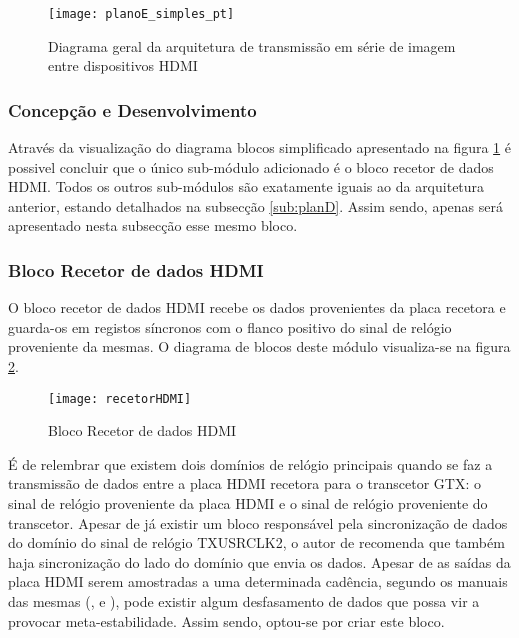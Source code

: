 \begin{figure}[h!]
	\begin{center}
		\leavevmode
		\texttt{[image: planoE\_simples\_pt]}
		\captionsetup{width=1.0\linewidth}
		\caption[Diagrama geral da arquitetura de transmissão em série de imagem entre dispositivos HDMI]{Diagrama geral da arquitetura de transmissão em série de imagem entre dispositivos HDMI}
		\label{fig:planE_simples}
	\end{center}
\end{figure}


\subsubsection{Concepção e Desenvolvimento}

Através da visualização do diagrama blocos simplificado apresentado na figura \ref{fig:planE_simples} é possivel concluir que o único sub-módulo adicionado é o bloco recetor de dados HDMI. Todos os outros sub-módulos são exatamente iguais ao da arquitetura anterior, estando detalhados na subsecção \ref{sub:planD}. Assim sendo, apenas será apresentado nesta subsecção esse mesmo bloco.

\subsubsection*{Bloco Recetor de dados HDMI}
O bloco recetor de dados HDMI recebe os dados provenientes da placa recetora e guarda-os em registos síncronos com o flanco positivo do sinal de relógio proveniente da mesmas. O diagrama de blocos deste módulo visualiza-se na figura \ref{fig:recetorHDMI}.
\begin{figure}[h!]
	\begin{center}
		\leavevmode
		\texttt{[image: recetorHDMI]}
		\captionsetup{width=1.0\linewidth}
		\caption[Bloco recetor de dados HDMI]{Bloco Recetor de dados HDMI}
		\label{fig:recetorHDMI}
	\end{center}
\end{figure}

É de relembrar que existem dois domínios de relógio principais quando se faz a transmissão de dados entre a placa HDMI recetora para o transcetor GTX: o sinal de relógio proveniente da placa HDMI e o sinal de relógio proveniente do transcetor. Apesar de já existir um bloco responsável pela sincronização de dados do domínio do sinal de relógio TXUSRCLK2, o autor de \cite{R024} recomenda que também haja sincronização do lado do domínio que envia os dados. Apesar de as saídas da placa HDMI serem amostradas a uma determinada cadência, segundo os manuais das mesmas (\cite{R009}, \cite{R014} e \cite{R013}), pode existir algum desfasamento de dados que possa vir a provocar meta-estabilidade. Assim sendo, optou-se por criar este bloco.

